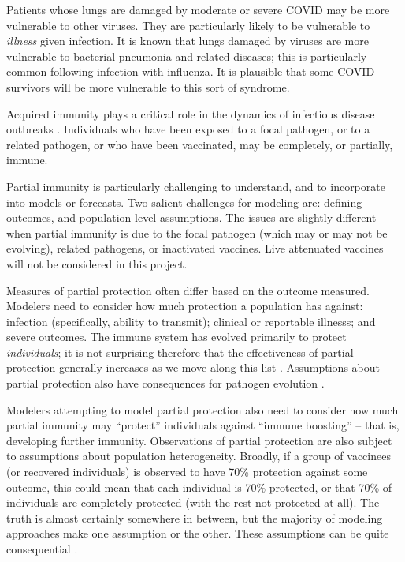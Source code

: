 
Patients whose lungs are damaged by moderate or severe COVID may be more vulnerable to other viruses. They are particularly likely to be vulnerable to \emph{illness} given infection.
It is known that lungs damaged by viruses are more vulnerable to bacterial pneumonia and related diseases; this is particularly common following infection with influenza.
It is plausible that some COVID survivors will be more vulnerable to this sort of syndrome.


\bigskip\noindent Acquired immunity plays a critical role in the dynamics of infectious disease outbreaks \cite{anderson1985vaccination}. Individuals who have been exposed to a focal pathogen, or to a related pathogen, or who have been vaccinated, may be completely, or partially, immune.

Partial immunity is particularly challenging to understand, and to incorporate into models or forecasts. Two salient challenges for modeling are: defining outcomes, and population-level assumptions. The issues are slightly different when partial immunity is due to the focal pathogen (which may or may not be evolving), related pathogens, or inactivated vaccines. Live attenuated vaccines will not be considered in this project.


Measures of partial protection often differ based on the outcome measured. Modelers need to consider how much protection a population has against: infection (specifically, ability to transmit); clinical or reportable illnesss; and severe outcomes. The immune system has evolved primarily to protect \emph{individuals}; it is not surprising therefore that the effectiveness of partial protection generally increases as we move along this list \cite{GodoyOutcomes}. Assumptions about partial protection also have consequences for pathogen evolution \cite{gandon2003imperfect}.

Modelers attempting to model partial protection also need to consider how much partial immunity may “protect” individuals against “immune boosting” -- that is, developing further immunity. Observations of partial protection are also subject to assumptions about population heterogeneity. Broadly, if a group of vaccinees (or recovered individuals) is observed to have 70\% protection against some outcome, this could mean that each individual is 70\% protected, or that 70\% of individuals are completely protected (with the rest not protected at all). The truth is almost certainly somewhere in between, but the majority of modeling approaches make one assumption or the other. These assumptions can be quite consequential \cite{arcBoost}.

